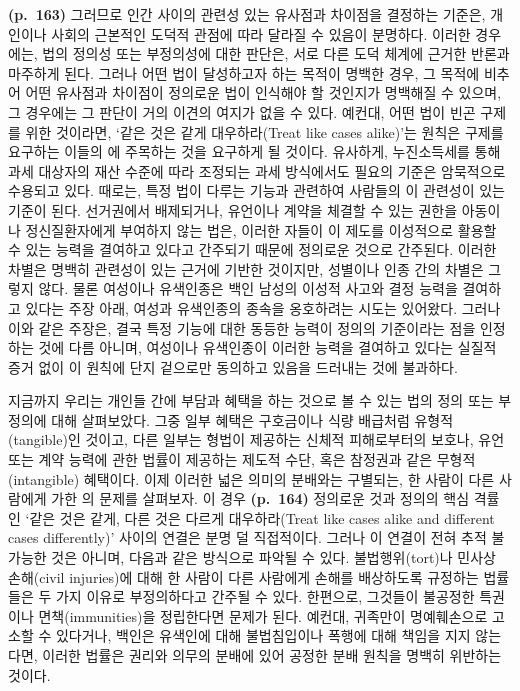 \textbf{(p.~163)} 그러므로 인간 사이의 관련성 있는 유사점과 차이점을
결정하는 기준은, 개인이나 사회의 근본적인 도덕적 관점에 따라 달라질 수
있음이 분명하다. 이러한 경우에는, 법의 정의성 또는 부정의성에 대한
판단은, 서로 다른 도덕 체계에 근거한 반론과 마주하게 된다. 그러나 어떤
법이 달성하고자 하는 목적이 명백한 경우, 그 목적에 비추어 어떤 유사점과
차이점이 정의로운 법이 인식해야 할 것인지가 명백해질 수 있으며, 그
경우에는 그 판단이 거의 이견의 여지가 없을 수 있다. 예컨대, 어떤 법이
빈곤 구제를 위한 것이라면, `같은 것은 같게 대우하라(Treat like cases
alike)'는 원칙은 구제를 요구하는 이들의 에 주목하는
것을 요구하게 될 것이다. 유사하게, 누진소득세를 통해 과세 대상자의 재산
수준에 따라 조정되는 과세 방식에서도 필요의 기준은 암묵적으로 수용되고
있다. 때로는, 특정 법이 다루는 기능과 관련하여 사람들의
이 관련성이 있는 기준이 된다. 선거권에서
배제되거나, 유언이나 계약을 체결할 수 있는 권한을 아동이나
정신질환자에게 부여하지 않는 법은, 이러한 자들이 이 제도를 이성적으로
활용할 수 있는 능력을 결여하고 있다고 간주되기 때문에 정의로운 것으로
간주된다. 이러한 차별은 명백히 관련성이 있는 근거에 기반한 것이지만,
성별이나 인종 간의 차별은 그렇지 않다. 물론 여성이나 유색인종은 백인
남성의 이성적 사고와 결정 능력을 결여하고 있다는 주장 아래, 여성과
유색인종의 종속을 옹호하려는 시도는 있어왔다. 그러나 이와 같은 주장은,
결국 특정 기능에 대한 동등한 능력이 정의의 기준이라는 점을 인정하는 것에
다름 아니며, 여성이나 유색인종이 이러한 능력을 결여하고 있다는 실질적
증거 없이 이 원칙에 단지 겉으로만 동의하고 있음을 드러내는 것에
불과하다.

지금까지 우리는 개인들 간에 부담과 혜택을 하는
것으로 볼 수 있는 법의 정의 또는 부정의에 대해 살펴보았다. 그중 일부
혜택은 구호금이나 식량 배급처럼 유형적(tangible)인 것이고, 다른 일부는
형법이 제공하는 신체적 피해로부터의 보호나, 유언 또는 계약 능력에 관한
법률이 제공하는 제도적 수단, 혹은 참정권과 같은 무형적(intangible)
혜택이다. 이제 이러한 넓은 의미의 분배와는 구별되는, 한 사람이 다른
사람에게 가한 의 문제를 살펴보자.
이 경우 \textbf{(p.~164)} 정의로운 것과 정의의 핵심 격률인 `같은 것은
같게, 다른 것은 다르게 대우하라(Treat like cases alike and different
cases differently)' 사이의 연결은 분명 덜 직접적이다. 그러나 이 연결이
전혀 추적 불가능한 것은 아니며, 다음과 같은 방식으로 파악될 수 있다.
불법행위(tort)나 민사상 손해(civil injuries)에 대해 한 사람이 다른
사람에게 손해를 배상하도록 규정하는 법률들은 두 가지 이유로 부정의하다고
간주될 수 있다. 한편으로, 그것들이 불공정한 특권이나 면책(immunities)을
정립한다면 문제가 된다. 예컨대, 귀족만이 명예훼손으로 고소할 수
있다거나, 백인은 유색인에 대해 불법침입이나 폭행에 대해 책임을 지지
않는다면, 이러한 법률은 권리와 의무의 분배에 있어 공정한 분배 원칙을
명백히 위반하는 것이다.

